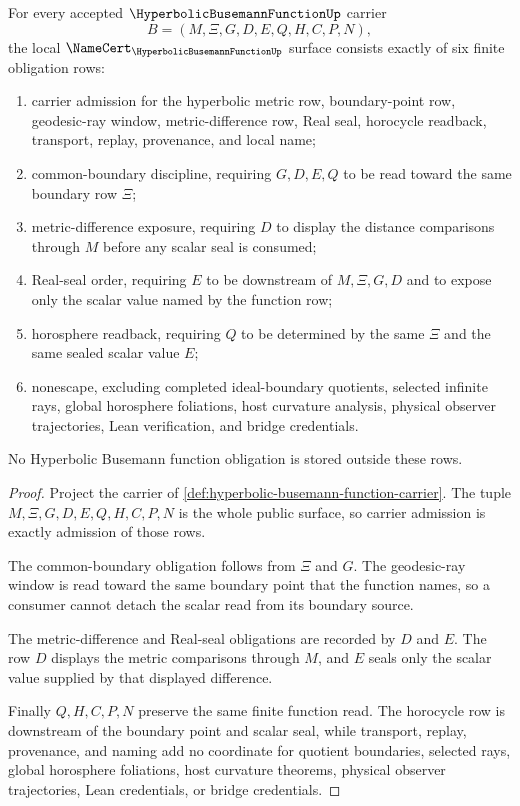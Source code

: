 \begin{theorem}
\label{thm:hyperbolic-busemann-function-namecert-obligations}
For every accepted $\HyperbolicBusemannFunctionUp$ carrier
$$
B=(M,\Xi,G,D,E,Q,H,C,P,N),
$$
the local $\NameCert_{\HyperbolicBusemannFunctionUp}$ surface consists exactly of six finite obligation rows:
\begin{enumerate}
\item carrier admission for the hyperbolic metric row, boundary-point row, geodesic-ray window, metric-difference row, Real seal, horocycle readback, transport, replay, provenance, and local name;
\item common-boundary discipline, requiring $G,D,E,Q$ to be read toward the same boundary row $\Xi$;
\item metric-difference exposure, requiring $D$ to display the distance comparisons through $M$ before any scalar seal is consumed;
\item Real-seal order, requiring $E$ to be downstream of $M,\Xi,G,D$ and to expose only the scalar value named by the function row;
\item horosphere readback, requiring $Q$ to be determined by the same $\Xi$ and the same sealed scalar value $E$;
\item nonescape, excluding completed ideal-boundary quotients, selected infinite rays, global horosphere foliations, host curvature analysis, physical observer trajectories, Lean verification, and bridge credentials.
\end{enumerate}
No Hyperbolic Busemann function obligation is stored outside these rows.
\end{theorem}
\begin{proof}
Project the carrier of \autoref{def:hyperbolic-busemann-function-carrier}. The tuple $M,\Xi,G,D,E,Q,H,C,P,N$ is the whole public surface, so carrier admission is exactly admission of those rows.

The common-boundary obligation follows from $\Xi$ and $G$. The geodesic-ray window is read toward the same boundary point that the function names, so a consumer cannot detach the scalar read from its boundary source.

The metric-difference and Real-seal obligations are recorded by $D$ and $E$. The row $D$ displays the metric comparisons through $M$, and $E$ seals only the scalar value supplied by that displayed difference.

Finally $Q,H,C,P,N$ preserve the same finite function read. The horocycle row is downstream of the boundary point and scalar seal, while transport, replay, provenance, and naming add no coordinate for quotient boundaries, selected rays, global horosphere foliations, host curvature theorems, physical observer trajectories, Lean credentials, or bridge credentials.
\end{proof}

